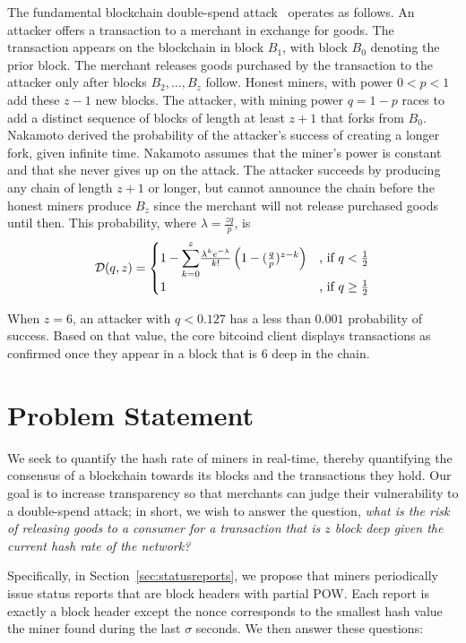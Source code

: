 \documentclass[10pt,sigconf]{acmart}
\newcommand{\1}{{\em (i)}}
\newcommand{\2}{{\em (ii)}}
\newcommand{\3}{{\em (iii)}}
\newcommand{\4}{{\em (iv)}}
\newcommand{\5}{{\em (v)}}
\begin{document}
The fundamental blockchain double-spend attack~\cite{Nakamoto:2009}
operates as follows. An attacker offers a transaction to a merchant in
exchange for goods. The transaction appears on the blockchain in block
$B_1$, with block $B_0$ denoting the prior block. The merchant
releases goods purchased by the transaction to the attacker only after
blocks $B_2,\dots,B_z$ follow. Honest miners, with power $0<p<1$ add
these $z-1$ new blocks. The attacker, with mining power $q=1-p$ races to add
a distinct sequence of blocks of length at least $z+1$ that forks from
$B_0$. Nakamoto derived the probability of the attacker's success of creating a longer fork, given infinite time. Nakamoto assumes that the miner's power
is constant and that she never gives up on the attack. The attacker
succeeds by producing any chain of length $z+1$ or longer, but cannot
announce the chain before the honest miners produce $B_z$ since the
merchant will not release purchased goods until then. This probability, where  $\lambda=\frac{zq}{p}$, 
is \begin{align}
  \mathcal{D}(q,z)=\begin{cases} 
 1- \mathlarger{\sum}_{k=0}^{z} \frac{\lambda^k e^{-\lambda}}{k!}\left(1-(\frac{q}{p})^{z-k}\right)
   & \text{, if }  q<\frac12 \\ 
    1 &  \text{, if } q\geq\frac12 \\
  \end{cases}\label{eq:satoshi}
 \end{align}

When $z=6$, an attacker with $q<0.127$ has a less than $0.001$
probability of success. Based on that value, the core bitcoind client
displays transactions as confirmed once they appear in a block that is
6 deep in the chain.


\section{Problem Statement}\label{sec:problem}

We seek to quantify the hash rate of miners in real-time, thereby
quantifying the consensus of a blockchain towards its blocks and the
transactions they hold.  Our goal is to increase transparency so that
merchants can judge their vulnerability to a double-spend attack; in
short, we wish to answer the question, \textit{what is the risk of releasing
goods to a consumer for a transaction that is $z$ block deep given the
current hash rate of the network?}

Specifically, in Section~\ref{sec:statusreports}, we propose that
miners periodically issue status reports that are block headers with
partial POW. Each report is exactly a block header except
the nonce corresponds to the smallest hash value the miner found
during the last $\sigma$ seconds.  We then answer these
 questions:
\end{document}
